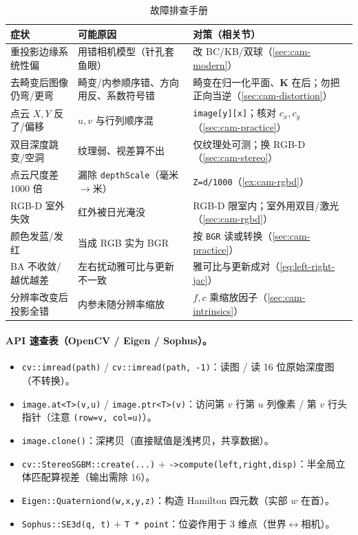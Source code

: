 \begin{table}[H]\centering\small
\caption{故障排查手册}
\begin{tabularx}{\linewidth}{lLL}
\toprule
症状 & 可能原因 & 对策（相关节） \\
\midrule
重投影边缘系统性偏 & 用错相机模型（针孔套鱼眼） & 改 BC/KB/双球（\cref{sec:cam-modern}） \\
去畸变后图像仍弯/更弯 & 畸变/内参顺序错、方向用反、系数符号错 & 畸变在归一化平面、$\mathbf{K}$ 在后；勿把正向当逆（\cref{sec:cam-distortion}） \\
点云 $X,Y$ 反了/偏移 & $u,v$ 与行列顺序混 & \texttt{image[y][x]}；核对 $c_x,c_y$（\cref{sec:cam-practice}） \\
双目深度跳变/空洞 & 纹理弱、视差算不出 & 仅纹理处可测；换 RGB-D（\cref{sec:cam-stereo}） \\
点云尺度差 $1000$ 倍 & 漏除 \texttt{depthScale}（毫米$\to$米） & \texttt{Z=d/1000}（\cref{ex:cam-rgbd}） \\
RGB-D 室外失效 & 红外被日光淹没 & RGB-D 限室内；室外用双目/激光（\cref{sec:cam-rgbd}） \\
颜色发蓝/发红 & 当成 RGB 实为 BGR & 按 \texttt{BGR} 读或转换（\cref{sec:cam-practice}） \\
BA 不收敛/越优越差 & 左右扰动雅可比与更新不一致 & 雅可比与更新成对（\cref{eq:left-right-jac}） \\
分辨率改变后投影全错 & 内参未随分辨率缩放 & $f,c$ 乘缩放因子（\cref{sec:cam-intrinsics}） \\
\bottomrule
\end{tabularx}
\end{table}

\paragraph{API 速查表（OpenCV / Eigen / Sophus）。}
\begin{itemize}
  \item \texttt{cv::imread(path)} / \texttt{cv::imread(path, -1)}：读图 / 读 16 位原始深度图（不转换）。
  \item \texttt{image.\allowbreak at<T>(v,u)} / \texttt{image.\allowbreak ptr<T>(v)}：访问第 $v$ 行第 $u$ 列像素 / 第 $v$ 行头指针（注意 \texttt{(row=v, col=u)}）。
  \item \texttt{image.\allowbreak clone()}：深拷贝（直接赋值是浅拷贝，共享数据）。
  \item \texttt{cv::StereoSGBM::create(...)} $+$ \texttt{->compute(left,right,disp)}：半全局立体匹配算视差（输出需除 $16$）。
  \item \texttt{Eigen::Quaterniond(w,x,y,z)}：构造 Hamilton 四元数（实部 $w$ 在首）。
  \item \texttt{Sophus::SE3d(q, t)} $+$ \texttt{T * point}：位姿作用于 3 维点（世界$\leftrightarrow$相机）。
\end{itemize}

